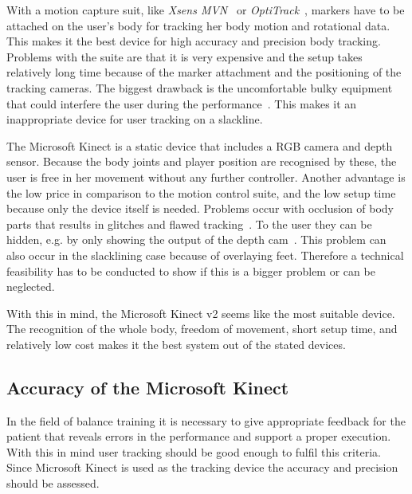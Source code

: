 With a motion capture suit, like \textit{Xsens MVN}~\cite{XsensMvn} or \textit{OptiTrack}~\cite{OptiTrack}, markers have to be attached on the user’s body for tracking her body motion and rotational data. This makes it the best device for high accuracy and precision body tracking. Problems with the suite are that it is very expensive and the setup takes relatively long time because of the marker attachment and the positioning of the tracking cameras. The biggest drawback is the uncomfortable bulky equipment that could interfere the user during the performance~\cite{Bogdanovych2015-ci, Chang2012-hz, Nusman2006-rf}. This makes it an inappropriate device for user tracking on a slackline.

The Microsoft Kinect is a static device that includes a RGB camera and depth sensor. Because the body joints and player position are recognised by these, the user is free in her movement without any further controller. Another advantage is the low price in comparison to the motion control suite, and the low setup time because only the device itself is needed. Problems occur with occlusion of body parts that results in glitches and flawed tracking~\cite{Kajastila2014-ug, Tang2015-wt}. To the user they can be hidden, e.g. by only showing the output of the depth cam~\cite{Holsti2013-kn}. This problem can also occur in the slacklining case because of overlaying feet. Therefore a technical feasibility has to be conducted to show if this is a bigger problem or can be neglected.

With this in mind, the Microsoft Kinect v2 seems like the most suitable device. The recognition of the whole body, freedom of movement, short setup time, and relatively low cost makes it the best system out of the stated devices.

\subsection{Accuracy of the Microsoft Kinect}

In the field of balance training it is necessary to give appropriate feedback for the patient that reveals errors in the performance and support a proper execution. With this in mind user tracking should be good enough to fulfil this criteria. Since Microsoft Kinect is used as the tracking device the accuracy and precision should be assessed.

